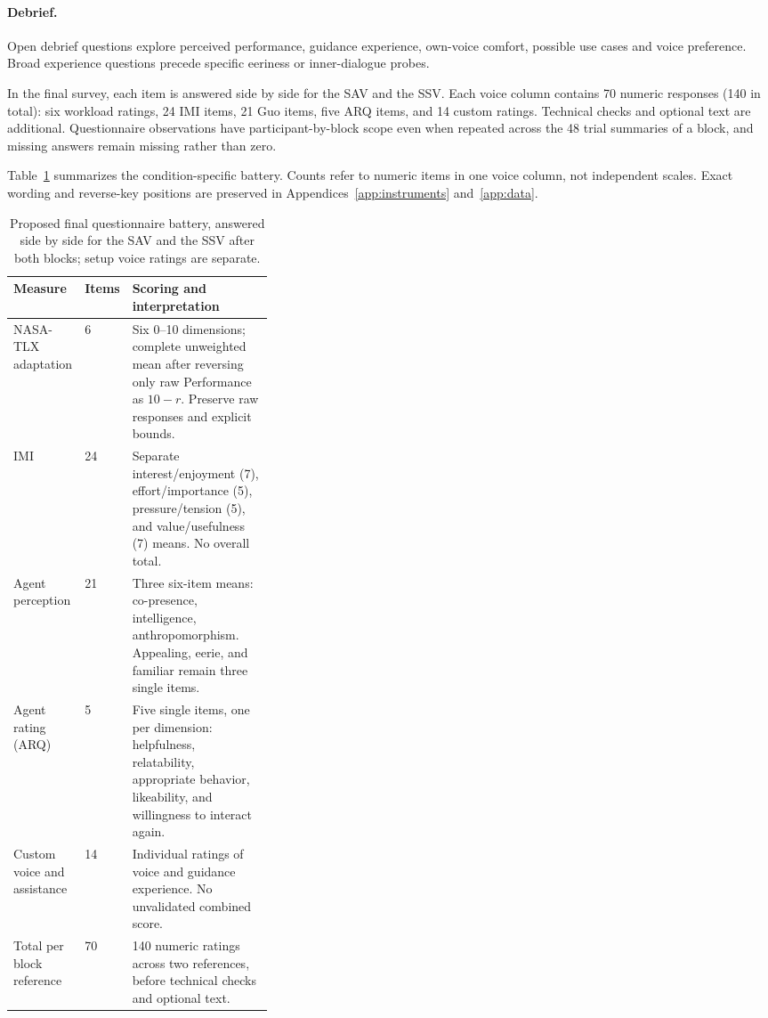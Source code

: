 \paragraph{Debrief.} Open debrief questions explore perceived performance, guidance experience, own-voice comfort, possible use cases and voice preference. Broad experience questions precede specific eeriness or inner-dialogue probes.

In the final survey, each item is answered side by side for the SAV and the SSV. Each voice column contains 70 numeric responses (140 in total): six workload ratings, 24 IMI items, 21 Guo items, five ARQ items, and 14 custom ratings. Technical checks and optional text are additional. Questionnaire observations have participant-by-block scope even when repeated across the 48 trial summaries of a block, and missing answers remain missing rather than zero.


Table~\ref{tab:battery} summarizes the condition-specific battery. Counts refer to numeric items in one voice column, not independent scales. Exact wording and reverse-key positions are preserved in Appendices~\ref{app:instruments} and~\ref{app:data}.
\begin{table}[htbp]
\centering
\caption[Condition-specific questionnaire battery]{Proposed final questionnaire battery, answered side by side for the SAV and the SSV after both blocks; setup voice ratings are separate.}
\label{tab:battery}
\small
{}
\begin{tabularx}{\linewidth}{@{}p{0.25\linewidth}p{0.09\linewidth}X@{}}
\toprule
Measure & Items & Scoring and interpretation \\\midrule
NASA-TLX adaptation & 6 & Six 0--10 dimensions; complete unweighted mean after reversing only raw Performance as $10-r$. Preserve raw responses and explicit bounds. \\
IMI & 24 & Separate interest/enjoyment (7), effort/importance (5), pressure/tension (5), and value/usefulness (7) means. No overall total. \\
Agent perception & 21 & Three six-item means: co-presence, intelligence, anthropomorphism. Appealing, eerie, and familiar remain three single items. \\
Agent rating (ARQ) & 5 & Five single items, one per dimension: helpfulness, relatability, appropriate behavior, likeability, and willingness to interact again. \\
Custom voice and assistance & 14 & Individual ratings of voice and guidance experience. No unvalidated combined score. \\\midrule
Total per block reference & 70 & 140 numeric ratings across two references, before technical checks and optional text. \\\bottomrule
\end{tabularx}
\end{table}

